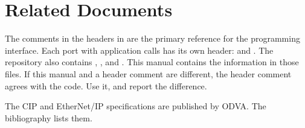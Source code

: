 \section*{Related Documents}

The comments in the headers in  are the primary reference
for the programming interface. Each port with application calls has its own
header:  and
. The repository also contains
, , and
. This manual contains the information in those
files. If this manual and a header comment are different, the header comment
agrees with the code. Use it, and report the difference.

The CIP and EtherNet/IP specifications are published by ODVA. The
bibliography lists them.
